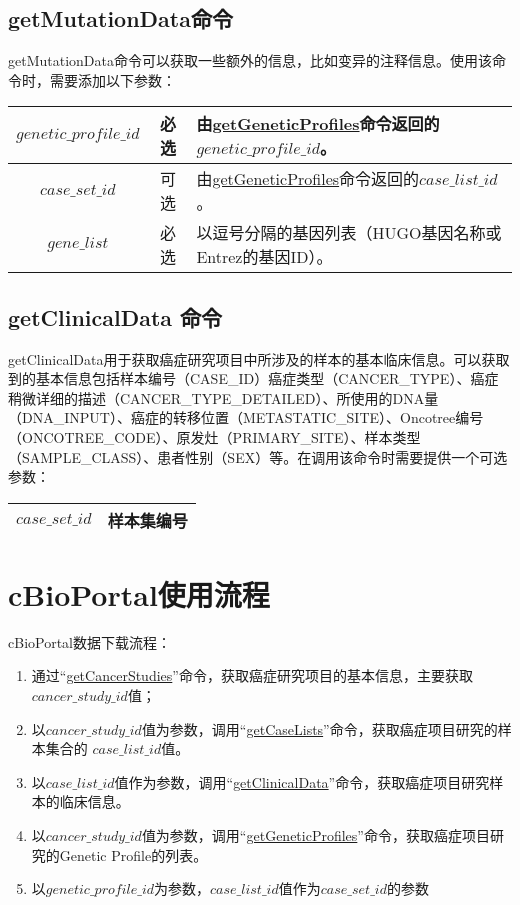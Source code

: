 \subsection{getMutationData命令}\label{subsec:getMutationData}
getMutationData命令可以获取一些额外的信息，比如变异的注释信息。使用该命令时，需要添加以下参数：
\begin{center}
\begin{tabular}{|c|c|l|}
	\hline
	$ genetic\_profile\_id $ & 必选 & 由\hyperref[subsec:getGeneticProfiles]{getGeneticProfiles}命令返回的$ genetic\_profile\_id $。\\
	\hline
	$ case\_set\_id $ & 可选 & 由\hyperref[subsec:getGeneticProfiles]{getGeneticProfiles}命令返回的$ case\_list\_id $。 \\
	\hline
	$ gene\_list $ & 必选 & 以逗号分隔的基因列表（HUGO基因名称或Entrez的基因ID）。\\
	\hline
\end{tabular}
\end{center}

\subsection{getClinicalData 命令}\label{subsec:getClinicalData }
getClinicalData用于获取癌症研究项目中所涉及的样本的基本临床信息。可以获取到的基本信息包括样本编号（CASE\_ID）癌症类型（CANCER\_TYPE）、癌症稍微详细的描述（CANCER\_TYPE\_DETAILED）、所使用的DNA量（DNA\_INPUT）、癌症的转移位置（METASTATIC\_SITE）、Oncotree编号（ONCOTREE\_CODE）、原发灶（PRIMARY\_SITE）、样本类型（SAMPLE\_CLASS）、患者性别（SEX）等。在调用该命令时需要提供一个可选参数：
\begin{center}
\begin{tabular}{|c|l|}
	\hline
	$ case\_set\_id $ & 样本集编号 \\
	\hline
\end{tabular}
\end{center}


\section{cBioPortal使用流程}
cBioPortal数据下载流程：
\begin{enumerate}
	\item 通过“\hyperref[subsec:getCancerStudies]{getCancerStudies}”命令，获取癌症研究项目的基本信息，主要获取$ cancer\_study\_id $值；
	\item 以$ cancer\_study\_id $值为参数，调用“\hyperref[subsec:getCaseLists]{getCaseLists}”命令，获取癌症项目研究的样本集合的 $ case\_list\_id $值。
	\item 以$ case\_list\_id $值作为参数，调用“\hyperref[subsec:getClinicalData]{getClinicalData}”命令，获取癌症项目研究样本的临床信息。
	\item 以$ cancer\_study\_id $值为参数，调用“\hyperref[subsec:getGeneticProfiles]{getGeneticProfiles}”命令，获取癌症项目研究的Genetic Profile的列表。
	\item 以$ genetic\_profile\_id $为参数，$ case\_list\_id $值作为$ case\_set\_id $的参数
\end{enumerate}